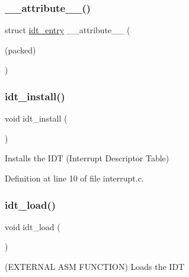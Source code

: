 \subsubsection{\texorpdfstring{\+\_\+\+\_\+attribute\+\_\+\+\_\+()}{\_\_attribute\_\_()}}
{\footnotesize\ttfamily struct \hyperlink{a00047}{idt\+\_\+entry} \+\_\+\+\_\+attribute\+\_\+\+\_\+ (\begin{DoxyParamCaption}\item[{(packed)}]{ }\end{DoxyParamCaption})}

\mbox{\label{a00017_a9817da253735954f4767c5ba6155aa0d_a9817da253735954f4767c5ba6155aa0d}} 
\subsubsection{\texorpdfstring{idt\+\_\+install()}{idt\_install()}}
{\footnotesize\ttfamily void idt\+\_\+install (\begin{DoxyParamCaption}{ }\end{DoxyParamCaption})}



Installs the I\+DT (Interrupt Descriptor Table) 



Definition at line 10 of file interrupt.\+c.

\mbox{\label{a00017_ac32911224d6d0fd8e287f2e021ee3ba4_ac32911224d6d0fd8e287f2e021ee3ba4}} 
\subsubsection{\texorpdfstring{idt\+\_\+load()}{idt\_load()}}
{\footnotesize\ttfamily void idt\+\_\+load (\begin{DoxyParamCaption}{ }\end{DoxyParamCaption})}



(E\+X\+T\+E\+R\+N\+AL A\+SM F\+U\+N\+C\+T\+I\+ON) Loads the I\+DT 

\mbox{\label{a00017_a498f153edfbc59b873e0ae610c3b0335_a498f153edfbc59b873e0ae610c3b0335}} 
